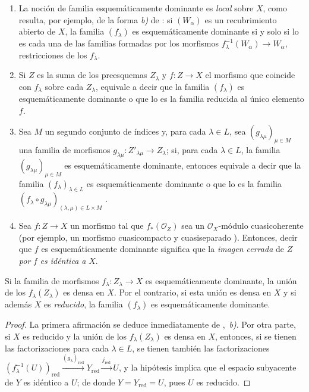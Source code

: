 \begin{remarks}[11.10.3]
\label{IV.11.10.3}
\medskip\noindent
\begin{enumerate}[label=(\roman*)]
  \item La noción de familia esquemáticamente dominante es \emph{local} sobre
$X$, como resulta, por ejemplo, de la forma \emph{b)} de : si $(W_\alpha)$ es un recubrimiento abierto de $X$, la familia $(f_\lambda)$ es esquemáticamente dominante si y solo si lo es cada una de las familias formadas por los morfismos $f_\lambda^{-1}(W_\alpha)\to W_\alpha$, restricciones de los $f_\lambda$.
  \item Si $Z$ es la suma de los preesquemas $Z_\lambda$ y $f:Z\to X$ el morfismo que coincide con $f_\lambda$ sobre cada $Z_\lambda$, equivale a decir que la familia $(f_\lambda)$ es esquemáticamente dominante o que lo es la familia reducida al único elemento $f$.
  \item Sea $M$ un segundo conjunto de índices y, para cada $\lambda\in L$, sea $(g_{\lambda\mu})_{\mu\in M}$ una familia de morfismos $g_{\lambda\mu}:Z'_{\lambda\mu}\to Z_\lambda$; si, para cada $\lambda\in L$, la familia $(g_{\lambda\mu})_{\mu\in M}$ es esquemáticamente dominante, entonces equivale a decir que la familia $(f_\lambda)_{\lambda\in L}$ es esquemáticamente dominante o que lo es la familia $(f_\lambda\circ g_{\lambda\mu})_{(\lambda,\mu)\in L\times M}$ .
  \item Sea $f:Z\to X$ un morfismo tal que $f_*(\mathcal O_Z)$ sea un $\mathcal O_X$-módulo cuasicoherente (por ejemplo, un morfismo cuasicompacto y cuasiseparado ).
  Entonces, decir que $f$ es esquemáticamente dominante significa que la \emph{imagen cerrada} de $Z$ \emph{por} $f$  \emph{es idéntica a} $X$.
\end{enumerate}
\end{remarks}

\begin{proposition}[11.10.4]
\label{IV.11.10.4}
Si la familia de morfismos $f_\lambda:Z_\lambda\to X$ es esquemáticamente dominante, la unión de los $f_\lambda(Z_\lambda)$ es densa en $X$.
Por el contrario, si esta unión es densa en $X$ y si además $X$ es \emph{reducido}, la familia $(f_\lambda)$ es esquemáticamente dominante.
\end{proposition}

\begin{proof}
La primera afirmación se deduce inmediatamente de ,~\emph{b)}.
Por otra parte, si $X$ es reducido y la unión de los $f_\lambda(Z_\lambda)$ es densa en $X$, entonces, si se tienen las factorizaciones  para cada $\lambda\in L$, se tienen también las factorizaciones $(f_\lambda^{-1}(U))_{\mathrm{red}}
\xrightarrow{(g_\lambda)_{\mathrm{red}}}Y_{\mathrm{red}}
\xrightarrow{j_{\mathrm{red}}}U$, y la hipótesis implica que el espacio subyacente de $Y$ es idéntico a $U$; de donde $Y=Y_{\mathrm{red}}=U$, pues $U$ es reducido.
\end{proof}

